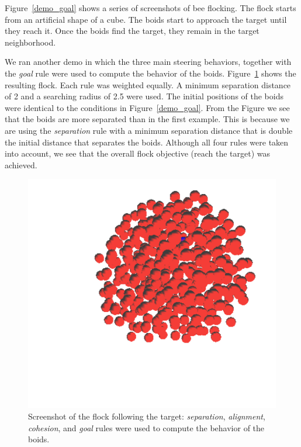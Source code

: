 Figure~\ref{demo_goal} shows a series of screenshots of bee flocking. The flock starts from an artificial shape of a cube. The boids start to approach the target until they reach it. Once the boids find the target, they remain in the target neighborhood. 

We ran another demo in which the three main steering behaviors, together with the \textit{goal} rule were used to compute the behavior of the boids. Figure~\ref{goal_4rules} shows the resulting flock. Each rule was weighted equally. A minimum separation distance of 2 and a searching radius of 2.5 were used. The initial positions of the boids were identical to the conditions in Figure~\ref{demo_goal}. From the Figure we see that the boids are more separated than in the first example. This is because we are using the \textit{separation} rule with a minimum separation distance that is double the initial distance that separates the boids. Although all four rules were taken into account, we see that the overall flock objective (reach the target) was achieved. 

\begin{figure}[htbp]
\begin{center}
\includegraphics[scale=0.35]{figures/demo_goal_4rules.pdf}
\caption{Screenshot of the flock following the target: \textit{separation}, \textit{alignment}, \textit{cohesion}, and \textit{goal} rules were used to compute the behavior of the boids.}
\label{goal_4rules}
\end{center}
\end{figure}

